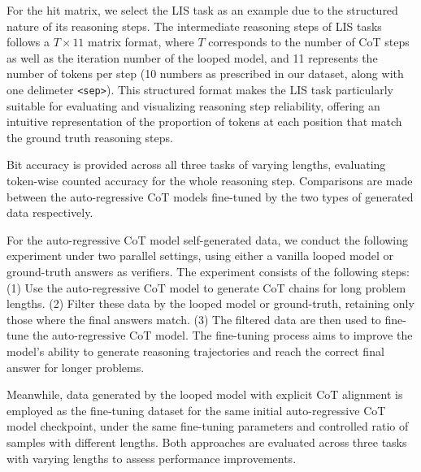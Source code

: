 For the hit matrix, we select the LIS task as an example due to the structured nature of its reasoning steps. The intermediate reasoning steps of LIS tasks follows a $T\times 11$ matrix format, where $T$ corresponds to the number of CoT steps as well as the iteration number of the looped model, and 11 represents the number of tokens per step (10 numbers as prescribed in our dataset, along with one delimeter \texttt{<sep>}). This structured format makes the LIS task particularly suitable for evaluating and visualizing reasoning step reliability, offering an intuitive representation of the proportion of tokens at each position that match the ground truth reasoning steps.

Bit accuracy is provided across all three tasks of varying lengths, evaluating token-wise counted accuracy for the whole reasoning step. Comparisons are made between the auto-regressive CoT models fine-tuned by the two types of generated data respectively. 




For the auto-regressive CoT model self-generated data, we conduct the following experiment under two parallel settings, using either a vanilla looped model or ground-truth answers as verifiers. The experiment consists of the following steps: (1) Use the auto-regressive CoT model to generate CoT chains for long problem lengths. (2) Filter these data by the looped model or ground-truth, retaining only those where the final answers match. (3) The filtered data are then used to fine-tune the auto-regressive CoT model. The fine-tuning process aims to improve the model's ability to generate reasoning trajectories and reach the correct final answer for longer problems. 

Meanwhile, data generated by the looped model with explicit CoT alignment is employed as the fine-tuning dataset for the same initial auto-regressive CoT model checkpoint, under the same fine-tuning parameters and controlled ratio of samples with different lengths. Both approaches are evaluated across three tasks with varying lengths to assess performance improvements.

